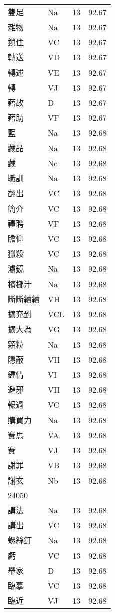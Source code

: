 \documentclass[twocolumn]{book}
\begin{document}
\begin{supertabular}{llrr}
雙足 & Na & 13 &  92.67\\
雜物 & Na & 13 &  92.67\\
鎖住 & VC & 13 &  92.67\\
轉送 & VD & 13 &  92.67\\
轉述 & VE & 13 &  92.67\\
轉 & VJ & 13 &  92.67\\
藉故 & D & 13 &  92.67\\
藉助 & VF & 13 &  92.67\\
藍 & Na & 13 &  92.68\\
藏品 & Na & 13 &  92.68\\
藏 & Nc & 13 &  92.68\\
職訓 & Na & 13 &  92.68\\
翻出 & VC & 13 &  92.68\\
簡介 & VC & 13 &  92.68\\
禮聘 & VF & 13 &  92.68\\
瞻仰 & VC & 13 &  92.68\\
獵殺 & VC & 13 &  92.68\\
濾鏡 & Na & 13 &  92.68\\
檳榔汁 & Na & 13 &  92.68\\
斷斷續續 & VH & 13 &  92.68\\
擴充到 & VCL & 13 &  92.68\\
擴大為 & VG & 13 &  92.68\\
顆粒 & Na & 13 &  92.68\\
隱蔽 & VH & 13 &  92.68\\
鍾情 & VI & 13 &  92.68\\
避邪 & VH & 13 &  92.68\\
輾過 & VC & 13 &  92.68\\
購買力 & Na & 13 &  92.68\\
賽馬 & VA & 13 &  92.68\\
賽 & VJ & 13 &  92.68\\
謝罪 & VB & 13 &  92.68\\
謝玄 & Nb & 13 &  92.68\\
24050\\
講法 & Na & 13 &  92.68\\
講出 & VC & 13 &  92.68\\
螺絲釘 & Na & 13 &  92.68\\
虧 & VC & 13 &  92.68\\
舉家 & D & 13 &  92.68\\
臨摹 & VC & 13 &  92.68\\
臨近 & VJ & 13 &  92.68\\

\end{supertabular}
\end{document}
